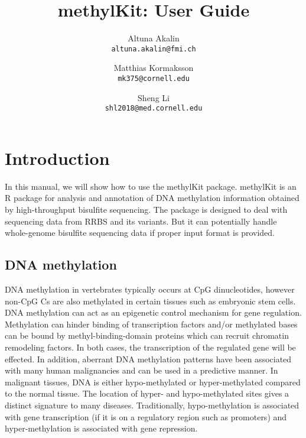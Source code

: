 \documentclass{article}
\title{ methylKit: User Guide}
\begin{document}


\author{Altuna Akalin\\ \texttt{altuna.akalin@fmi.ch}\\
\and
Matthias Kormaksson \\ \texttt{mk375@cornell.edu} 
\and Sheng Li  \\ \texttt{shl2018@med.cornell.edu}
}





\maketitle

\tableofcontents



\section{Introduction}
In this manual, we will show how to use the methylKit package. methylKit is an R package for analysis and annotation of DNA methylation information obtained by high-throughput bisulfite sequencing. The package is designed to deal with sequencing data from RRBS and its variants. But it can potentially handle whole-genome bisulfite sequencing data if proper input format is provided. 

\subsection{DNA methylation}
DNA methylation in vertebrates typically occurs at CpG dinucleotides, however non-CpG Cs are also methylated in certain tissues such as embryonic stem cells. DNA methylation can act as an epigenetic control mechanism for gene regulation. Methylation can hinder binding of transcription factors and/or methylated bases can be bound by methyl-binding-domain proteins which can recruit chromatin remodeling factors. In both cases, the transcription of the regulated gene will be effected. In addition, aberrant DNA methylation patterns have been associated with many human malignancies and can be used in a predictive manner. In malignant tissues, DNA is either hypo-methylated or hyper-methylated compared to the normal tissue. The location of hyper- and hypo-methylated sites gives a distinct signature to many diseases. Traditionally, hypo-methylation is associated with gene transcription (if it is on a regulatory region such as promoters) and hyper-methylation is associated with gene repression.
\end{document}
